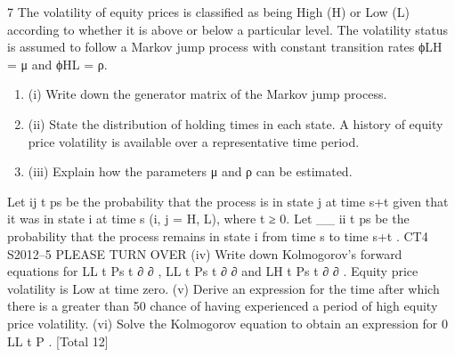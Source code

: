 \documentclass[a4paper,12pt]{article}
\begin{document}
7 The volatility of equity prices is classified as being High (H) or Low (L) according to
whether it is above or below a particular level. The volatility status is assumed to
follow a Markov jump process with constant transition rates ϕLH = μ and ϕHL = ρ.
\begin{enumerate}
\item (i) Write down the generator matrix of the Markov jump process. 
\item (ii) State the distribution of holding times in each state. 
A history of equity price volatility is available over a representative time period.
\item (iii) Explain how the parameters μ and ρ can be estimated. 
\end{enumerate}
Let ij
t ps be the probability that the process is in state j at time s+t given that it was in
state i at time s (i, j = H, L), where t ≥ 0. Let
__
ii
t ps be the probability that the process
remains in state i from time s to time s+t .
CT4 S2012–5 PLEASE TURN OVER
(iv) Write down Kolmogorov’s forward equations for LL
t Ps
t
∂
∂
, LL
t Ps
t
∂
∂
and
LH
t Ps
t
∂
∂
. 
Equity price volatility is Low at time zero.
(v) Derive an expression for the time after which there is a greater than 50%
chance of having experienced a period of high equity price volatility. 
(vi) Solve the Kolmogorov equation to obtain an expression for 0
LL
t P . 
[Total 12]

\end{document}
